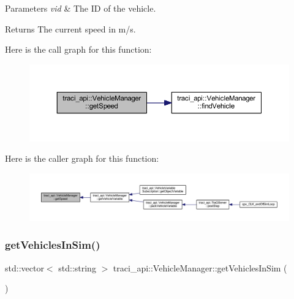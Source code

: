 \begin{DoxyParams}{Parameters}
{\em vid} & The ID of the vehicle. \\
\hline
\end{DoxyParams}
\begin{DoxyReturn}{Returns}
The current speed in m/s. 
\end{DoxyReturn}
Here is the call graph for this function\+:
\nopagebreak
\begin{figure}[H]
\begin{center}
\leavevmode
\includegraphics[width=350pt]{classtraci__api_1_1_vehicle_manager_aa5f5a8c13bdd6b1407da5b5ffb6a8559_cgraph}
\end{center}
\end{figure}
Here is the caller graph for this function\+:
\nopagebreak
\begin{figure}[H]
\begin{center}
\leavevmode
\includegraphics[width=350pt]{classtraci__api_1_1_vehicle_manager_aa5f5a8c13bdd6b1407da5b5ffb6a8559_icgraph}
\end{center}
\end{figure}
\mbox{\label{classtraci__api_1_1_vehicle_manager_ae70d2421d4a96ab7601dabb6fcc512b2}} 
\subsubsection{\texorpdfstring{get\+Vehicles\+In\+Sim()}{getVehiclesInSim()}}
{\footnotesize\ttfamily std\+::vector$<$ std\+::string $>$ traci\+\_\+api\+::\+Vehicle\+Manager\+::get\+Vehicles\+In\+Sim (\begin{DoxyParamCaption}{ }\end{DoxyParamCaption})}

